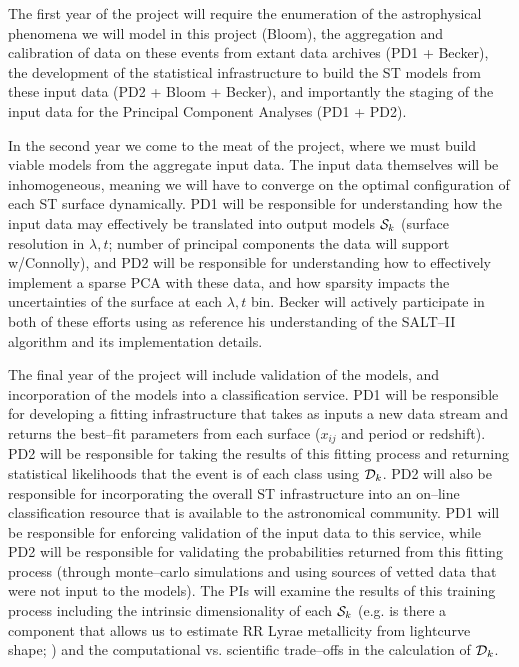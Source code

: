  \smallskip

The first year of the project will require the enumeration of the astrophysical
phenomena we will model in this project (Bloom), the aggregation and calibration
of data on these events from extant data archives (PD1 + Becker), the
development of the statistical infrastructure to build the ST models from these
input data (PD2 + Bloom + Becker), and importantly the staging of the input data
for the Principal Component Analyses (PD1 + PD2).

 \smallskip

In the second year we come to the meat of the project, where we must build
viable models from the aggregate input data.  The input data themselves will be
inhomogeneous, meaning we will have to converge on the optimal configuration of
each ST surface dynamically. PD1 will be responsible for understanding how the
input data may effectively be translated into output models ${\cal S}_k$
(surface resolution in $\lambda, t$; number of principal components the data
will support w/Connolly), and PD2 will be responsible for understanding how to
effectively implement a sparse PCA with these data, and how sparsity impacts the
uncertainties of the surface at each $\lambda, t$ bin. Becker will actively
participate in both of these efforts using as reference his understanding of the
SALT--II algorithm and its implementation details.


 \smallskip

The final year of the project will include validation of the models, and
incorporation of the models into a classification service.  PD1 will be
responsible for developing a fitting infrastructure that takes as inputs a new
data stream and returns the best--fit parameters from each surface ($x_{ij}$ and
period or redshift).  PD2 will be responsible for taking the results of this
fitting process and returning statistical likelihoods that the event is of each
class using ${\cal D}_k$.  PD2 will also be responsible for incorporating the
overall ST infrastructure into an on--line classification resource that is
available to the astronomical community. PD1 will be responsible for enforcing
validation of the input data to this service, while PD2 will be responsible for
validating the probabilities returned from this fitting process (through
monte--carlo simulations and using sources of vetted data that were not input to
the models). The PIs will examine the results of this training process including
the intrinsic dimensionality of each ${\cal S}_k$ (e.g. is there a component
that allows us to estimate RR Lyrae metallicity from lightcurve shape;
\citealt{1996A&A...312..111J}) and the computational vs. scientific trade--offs
in the calculation of ${\cal D}_k$.

